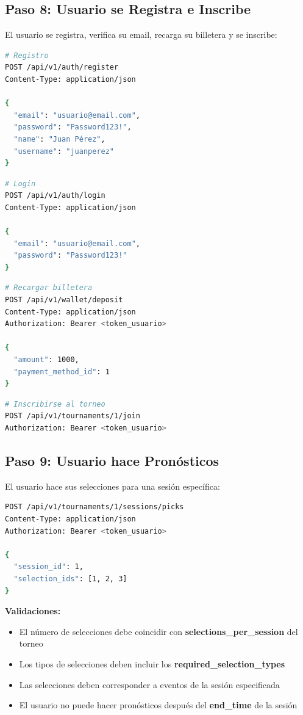 \documentclass[12pt,a4paper]{article}
\begin{document}
\subsection{Paso 8: Usuario se Registra e Inscribe}
El usuario se registra, verifica su email, recarga su billetera y se inscribe:

\begin{lstlisting}[language=bash]
# Registro
POST /api/v1/auth/register
Content-Type: application/json

{
  "email": "usuario@email.com",
  "password": "Password123!",
  "name": "Juan Pérez",
  "username": "juanperez"
}
\end{lstlisting}

\begin{lstlisting}[language=bash]
# Login
POST /api/v1/auth/login
Content-Type: application/json

{
  "email": "usuario@email.com",
  "password": "Password123!"
}
\end{lstlisting}

\begin{lstlisting}[language=bash]
# Recargar billetera
POST /api/v1/wallet/deposit
Content-Type: application/json
Authorization: Bearer <token_usuario>

{
  "amount": 1000,
  "payment_method_id": 1
}
\end{lstlisting}

\begin{lstlisting}[language=bash]
# Inscribirse al torneo
POST /api/v1/tournaments/1/join
Authorization: Bearer <token_usuario>
\end{lstlisting}

\subsection{Paso 9: Usuario hace Pronósticos}
El usuario hace sus selecciones para una sesión específica:

\begin{lstlisting}[language=bash]
POST /api/v1/tournaments/1/sessions/picks
Content-Type: application/json
Authorization: Bearer <token_usuario>

{
  "session_id": 1,
  "selection_ids": [1, 2, 3]
}
\end{lstlisting}

\textbf{Validaciones:}
\begin{itemize}
    \item El número de selecciones debe coincidir con \textbf{selections\_per\_session} del torneo
    \item Los tipos de selecciones deben incluir los \textbf{required\_selection\_types}
    \item Las selecciones deben corresponder a eventos de la sesión especificada
    \item El usuario no puede hacer pronósticos después del \textbf{end\_time} de la sesión
\end{itemize}
\end{document}
